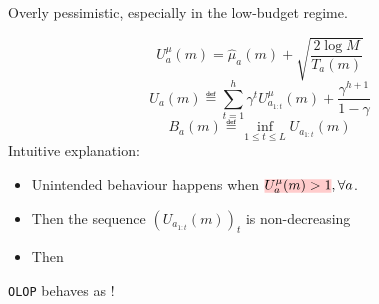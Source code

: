 \documentclass[paperwidth=36in, paperheight=48in,portrait,fontscale=0.35, margin=2cm]{baposter}
\begin{document}
\begin{poster}
{Overly pessimistic, especially in the low-budget regime.

\begin{equation}
         U^{\mu}_a(m) = \hat{\mu}_a(m) + \sqrt{\frac{2 \log M}{T_a(m)}}
    \end{equation}
    \begin{equation}
    \label{eq:Ua}
        U_a(m) \eqdef \sum_{t = 1}^h \gamma^t U^{\mu}_{a_{1:t}}(m) + \frac{\gamma^{h+1}}{1-\gamma}
    \end{equation}
    \begin{equation}
    \label{eq:Ba}
        B_a(m) \eqdef \inf_{1 \leq t \leq L} U_{a_{1:t}}(m)
    \end{equation}
    Intuitive explanation: 
    \begin{itemize}
        \item Unintended behaviour happens when $\hler{U^{\mu}_a(m) > 1}, \forall a$. 
        \item Then the sequence $(U_{a_{1:t}}(m))_t$ is non-decreasing
        \item Then 
    \end{itemize}



\begin{center}
\texttt{OLOP} behaves as !    
\end{center}
}


\end{poster}
\end{document}

